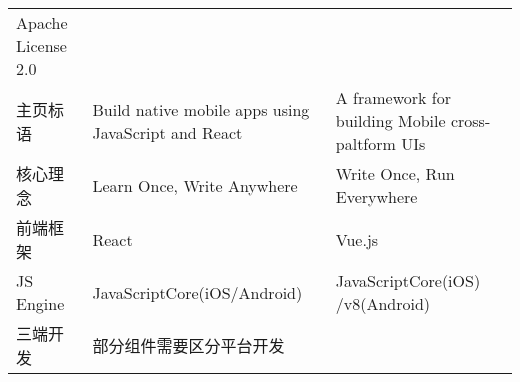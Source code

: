 \begin{longtable}[]{@{}lll@{}}
\begin{minipage}[t]{0.30\columnwidth}
Apache License 2.0\strut
\end{minipage}\tabularnewline
\begin{minipage}[t]{0.30\columnwidth}\raggedright\strut
主页标语\strut
\end{minipage} & \begin{minipage}[t]{0.30\columnwidth}\raggedright\strut
Build native mobile apps using JavaScript and React\strut
\end{minipage} & \begin{minipage}[t]{0.30\columnwidth}\raggedright\strut
A framework for building Mobile cross-paltform UIs\strut
\end{minipage}\tabularnewline
\begin{minipage}[t]{0.30\columnwidth}\raggedright\strut
核心理念\strut
\end{minipage} & \begin{minipage}[t]{0.30\columnwidth}\raggedright\strut
Learn Once, Write Anywhere\strut
\end{minipage} & \begin{minipage}[t]{0.30\columnwidth}\raggedright\strut
Write Once, Run Everywhere\strut
\end{minipage}\tabularnewline
\begin{minipage}[t]{0.30\columnwidth}\raggedright\strut
前端框架\strut
\end{minipage} & \begin{minipage}[t]{0.30\columnwidth}\raggedright\strut
React\strut
\end{minipage} & \begin{minipage}[t]{0.30\columnwidth}\raggedright\strut
Vue.js\strut
\end{minipage}\tabularnewline
\begin{minipage}[t]{0.30\columnwidth}\raggedright\strut
JS Engine\strut
\end{minipage} & \begin{minipage}[t]{0.30\columnwidth}\raggedright\strut
JavaScriptCore(iOS/Android)\strut
\end{minipage} & \begin{minipage}[t]{0.30\columnwidth}\raggedright\strut
JavaScriptCore(iOS) /v8(Android)\strut
\end{minipage}\tabularnewline
\begin{minipage}[t]{0.30\columnwidth}\raggedright\strut
三端开发\strut
\end{minipage} & \begin{minipage}[t]{0.30\columnwidth}\raggedright\strut
部分组件需要区分平台开发\strut

\end{minipage}
\end{longtable}
